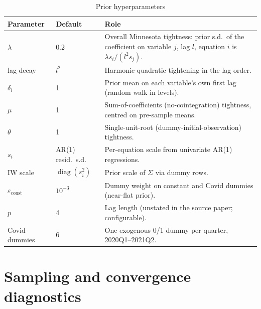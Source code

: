 \begin{table}[h]
\centering
\caption{Prior hyperparameters}
\label{tab:priors}
\small
\begin{tabular}{llp{8.3cm}}
\toprule
Parameter & Default & Role \\
\midrule
$\lambda$ & 0.2 & Overall Minnesota tightness: prior s.d.\ of the coefficient on variable $j$, lag $l$, equation $i$ is $\lambda s_i / (l^2 s_j)$. \\
lag decay & $l^2$ & Harmonic-quadratic tightening in the lag order. \\
$\delta_i$ & 1 & Prior mean on each variable's own first lag (random walk in levels). \\
$\mu$ & 1 & Sum-of-coefficients (no-cointegration) tightness, centred on pre-sample means. \\
$\theta$ & 1 & Single-unit-root (dummy-initial-observation) tightness. \\
$s_i$ & AR(1) resid.\ s.d. & Per-equation scale from univariate AR(1) regressions. \\
IW scale & $\operatorname{diag}(s_i^2)$ & Prior scale of $\Sigma$ via dummy rows. \\
$\varepsilon_{\text{const}}$ & $10^{-3}$ & Dummy weight on constant and Covid dummies (near-flat prior). \\
$p$ & 4 & Lag length (unstated in the source paper; configurable). \\
Covid dummies & 6 & One exogenous 0/1 dummy per quarter, 2020Q1--2021Q2. \\
\bottomrule
\end{tabular}
\end{table}

\section{Sampling and convergence diagnostics}
\label{app:diagnostics}

